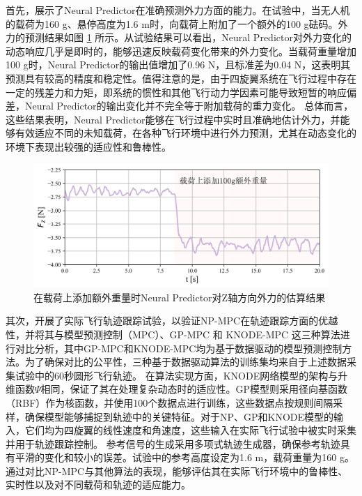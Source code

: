 \documentclass[lang=chs, degree=master, blindreview=true, winfonts=true]{yanputhesis}
\begin{document}
首先，展示了Neural Predictor在准确预测外力方面的能力。在试验中，当无人机的载荷为160 g、悬停高度为1.6 m时，向载荷上附加了一个额外的100 g砝码。外力的预测结果如图 \ref{force} 所示。从试验结果可以看出，Neural Predictor对外力变化的动态响应几乎是即时的，能够迅速反映载荷变化带来的外力变化。当载荷重量增加100 g时，Neural Predictor的输出值增加了0.96 N，且标准差为0.04 N，这表明其预测具有较高的精度和稳定性。值得注意的是，由于四旋翼系统在飞行过程中存在一定的残差力和力矩，即系统的惯性和其他飞行动力学因素可能导致短暂的响应偏差，Neural Predictor的输出变化并不完全等于附加载荷的重力变化。
总体而言，这些结果表明，Neural Predictor能够在飞行过程中实时且准确地估计外力，并能够有效适应不同的未知载荷，在各种飞行环境中进行外力预测，尤其在动态变化的环境下表现出较强的适应性和鲁棒性。



\begin{figure}[hbt!]
	\centering
	\includegraphics[width=34pc]{picture/kk/force.png} 
	\caption{在载荷上添加额外重量时Neural Predictor对Z轴方向外力的估算结果} 
	\label{force}
\end{figure}

其次，开展了实际飞行轨迹跟踪试验，以验证NP-MPC在轨迹跟踪方面的优越性，并将其与模型预测控制（MPC）、GP-MPC \cite{torrente2021data} 和 KNODE-MPC \cite{Chee2022} 这三种算法进行对比分析，其中GP-MPC和KNODE-MPC均为基于数据驱动的模型预测控制方法。为了确保对比的公平性，三种基于数据驱动算法的训练集均来自于上述数据采集试验中的60秒圆形飞行轨迹。
在算法实现方面，KNODE网络模型的架构与升维函数$\Psi$相同，保证了其在处理复杂动态时的适应性。GP模型则采用径向基函数（RBF）作为核函数，并使用100个数据点进行训练，这些数据点按规则间隔采样，确保模型能够捕捉到轨迹中的关键特征。对于NP、GP和KNODE模型的输入，它们均为四旋翼的线性速度和角速度，这些输入在实际飞行试验中被实时采集并用于轨迹跟踪控制。
参考信号的生成采用多项式轨迹生成器，确保参考轨迹具有平滑的变化和较小的误差。试验中的参考高度设定为1.6 m，载荷重量为160 g。通过对比NP-MPC与其他算法的表现，能够评估其在实际飞行环境中的鲁棒性、实时性以及对不同载荷和轨迹的适应能力。
\end{document}

